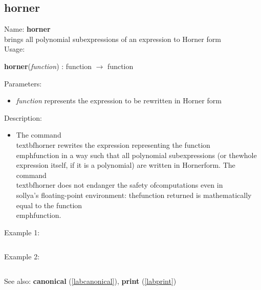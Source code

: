 \subsection{horner}
\label{labhorner}
\noindent Name: \textbf{horner}\\
brings all polynomial subexpressions of an expression to Horner form\\
\noindent Usage: 
\begin{center}
\textbf{horner}(\emph{function}) : \textsf{function} $\rightarrow$ \textsf{function}\\
\end{center}
Parameters: 
\begin{itemize}
\item \emph{function} represents the expression to be rewritten in Horner form
\end{itemize}
\noindent Description: \begin{itemize}

\item The command \\textbf{horner} rewrites the expression representing the function\n   \\emph{function} in a way such that all polynomial subexpressions (or the\n   whole expression itself, if it is a polynomial) are written in Horner\n   form.  The command \\textbf{horner} does not endanger the safety of\n   computations even in \\sollya's floating-point environment: the\n   function returned is mathematically equal to the function \\emph{function}.\n\end{itemize}
\noindent Example 1: 
\begin{center}\begin{minipage}{15cm}\begin{Verbatim}[frame=single]
\end{Verbatim}
\end{minipage}\end{center}
\noindent Example 2: 
\begin{center}\begin{minipage}{15cm}\begin{Verbatim}[frame=single]
\end{Verbatim}
\end{minipage}\end{center}
See also: \textbf{canonical} (\ref{labcanonical}), \textbf{print} (\ref{labprint})
